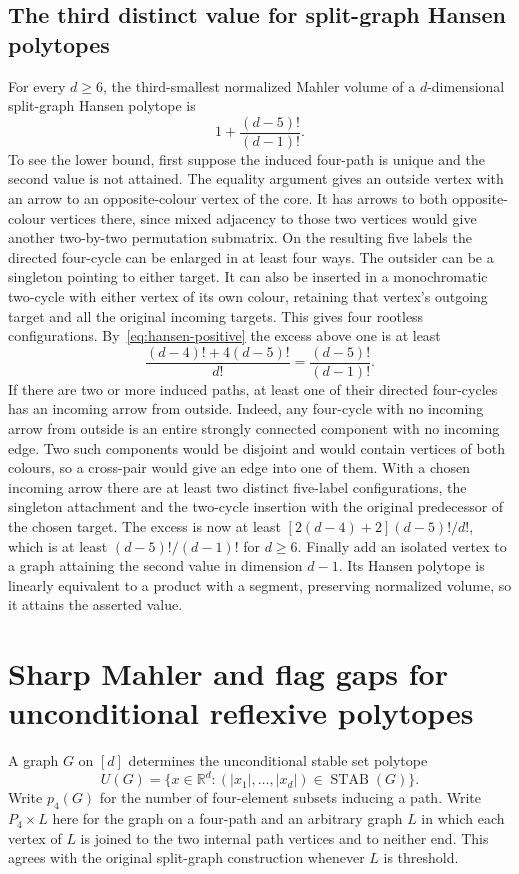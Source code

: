 \documentclass[11pt,a4paper]{article}
\numberwithin{equation}{section}
\begin{document}
\subsection{The third distinct value for split-graph Hansen polytopes}
For every $d\ge6$, the third-smallest normalized Mahler volume of a $d$-dimensional split-graph Hansen polytope is
\[
                    1+\frac{(d-5)!}{(d-1)!}.
\]
To see the lower bound, first suppose the induced four-path is unique and the second value is not attained. The equality argument gives an outside vertex with an arrow to an opposite-colour vertex of the core. It has arrows to both opposite-colour vertices there, since mixed adjacency to those two vertices would give another two-by-two permutation submatrix. On the resulting five labels the directed four-cycle can be enlarged in at least four ways. The outsider can be a singleton pointing to either target. It can also be inserted in a monochromatic two-cycle with either vertex of its own colour, retaining that vertex's outgoing target and all the original incoming targets. This gives four rootless configurations. By~\eqref{eq:hansen-positive} the excess above one is at least
\[
 \frac{(d-4)!+4(d-5)!}{d!}=\frac{(d-5)!}{(d-1)!}.
\]
If there are two or more induced paths, at least one of their directed four-cycles has an incoming arrow from outside. Indeed, any four-cycle with no incoming arrow from outside is an entire strongly connected component with no incoming edge. Two such components would be disjoint and would contain vertices of both colours, so a cross-pair would give an edge into one of them. With a chosen incoming arrow there are at least two distinct five-label configurations, the singleton attachment and the two-cycle insertion with the original predecessor of the chosen target. The excess is now at least $[2(d-4)+2](d-5)!/d!$, which is at least $(d-5)!/(d-1)!$ for $d\ge6$. Finally add an isolated vertex to a graph attaining the second value in dimension $d-1$. Its Hansen polytope is linearly equivalent to a product with a segment, preserving normalized volume, so it attains the asserted value.
\section{Sharp Mahler and flag gaps for unconditional reflexive polytopes}
A graph $G$ on $[d]$ determines the unconditional stable set polytope
\[
 U(G)=\{x\in\mathbb R^d:(|x_1|,\ldots,|x_d|)\in\operatorname{STAB}(G)\}.
\]
Write $p_4(G)$ for the number of four-element subsets inducing a path. Write $P_4\times L$ here for the graph on a four-path and an arbitrary graph $L$ in which each vertex of $L$ is joined to the two internal path vertices and to neither end. This agrees with the original split-graph construction whenever $L$ is threshold.
\end{document}
